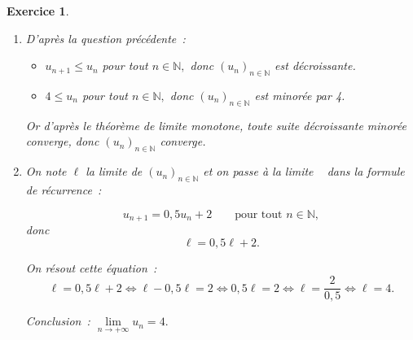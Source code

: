 \documentclass[10pt]{article}
\newtheorem{exo}{Exercice}
\begin{document}
\begin{exo}
\begin{enumerate}
\begin{itemize}
La propriété $\mathcal{P}_{k+1}$ est donc vraie.
\item[{\textbullet}] \textbf{Conclusion.} $\mathcal{P}_0$ est vraie et $\mathcal{P}_n$ est héréditaire, donc elle est vraie pour tout $n\in\mathbb{N}.$
\end{itemize}
\item D'après la question précédente~:

\begin{itemize}
\item[{\textbullet}] $u_{n+1}\leq u_n$ pour tout $n\in\mathbb{N},$ donc $(u_n)_{n\in\mathbb{N}}$ est décroissante.
\item[{\textbullet}] $4\leq u_n$ pour tout $n\in\mathbb{N},$ donc $(u_n)_{n\in\mathbb{N}}$ est minorée par 4.
\end{itemize}

Or d'après le théorème de limite monotone, toute suite décroissante minorée converge, donc $(u_n)_{n\in\mathbb{N}}$ converge.
\item On note $\ell$ la limite de $\left(u_n\right)_{n\in\mathbb{N}}$ et \og on passe à la limite \fg~{} dans la formule de récurrence~:

\[u_{n+1}=0,5u_n+2\qquad\text{pour tout }n\in\mathbb{N},\] donc
\[\ell=0,5\ell+2.\]

On résout cette équation~:
\[\ell=0,5\ell+2\iff \ell-0,5\ell=2\iff 0,5\ell=2\iff\ell=\frac{2}{0,5}\iff \ell=4.\]

Conclusion~: $\lim\limits_{n\to +\infty}u_n=4.$

\end{enumerate}

\end{exo}
\end{document}
